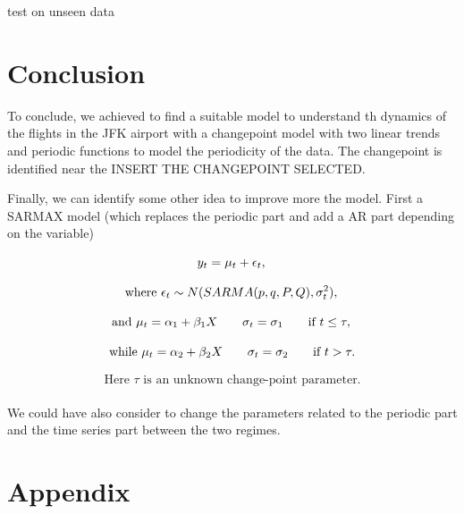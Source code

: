 \documentclass[12pt, titlepage]{article}
\begin{document}
test on unseen data

\section{Conclusion}

To conclude, we achieved to find a suitable model to understand th dynamics of the flights in the JFK airport with a changepoint model with two linear trends and
periodic functions to model the periodicity of the data. The changepoint is identified near the INSERT THE CHANGEPOINT SELECTED. 

Finally, we can identify some other idea to improve more the model. First a SARMAX model (which replaces the periodic part and add a AR part depending on the variable)

\begin{displaymath}
 y_t = \mu_t + \epsilon_t, \\ 
\end{displaymath}

\begin{displaymath}
 \text{where } \epsilon_t \sim {N}(SARMA(p,q,P,Q),\sigma_t^2), \\
\end{displaymath}

\begin{displaymath}
 \text{and }  \mu_t = \alpha_1+\beta_1 X \qquad \sigma_t = \sigma_1 \qquad \text{if } t \leq \tau, \\
\end{displaymath}

\begin{displaymath}
 \text{while } \mu_t = \alpha_2+\beta_2 X \qquad \sigma_t = \sigma_2 \qquad \text{if } t > \tau.\\
\end{displaymath}

\begin{displaymath}
 \text{Here } \tau \text{ is an unknown change-point parameter.}
\end{displaymath}\\


We could  have also consider to change the parameters related to the periodic part and the time series part between the two regimes. 


\newpage
\section{Appendix}
\end{document}
